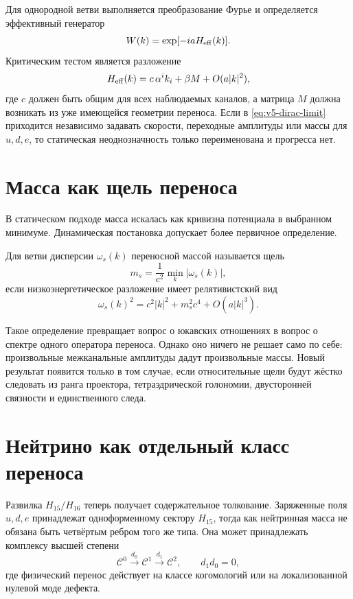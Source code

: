 Для однородной ветви выполняется преобразование Фурье и определяется
эффективный генератор
\begin{equation}
 W(k)=\exp[-iaH_{\rm eff}(k)].
\end{equation}
Критическим тестом является разложение
\begin{equation}
 H_{\rm eff}(k)=c\,\alpha^ik_i+\beta M+O(a|k|^2),
 \label{eq:v5-dirac-limit}
\end{equation}
где $c$ должен быть общим для всех наблюдаемых каналов, а матрица $M$
должна возникать из уже имеющейся геометрии переноса. Если в
\eqref{eq:v5-dirac-limit} приходится независимо задавать скорости,
переходные амплитуды или массы для $u,d,e$, то статическая неоднозначность
только переименована и прогресса нет.

\section{Масса как щель переноса}

В статическом подходе масса искалась как кривизна потенциала в выбранном
минимуме. Динамическая постановка допускает более первичное определение.

\begin{definition}
Для ветви дисперсии $\omega_s(k)$ переносной массой называется щель
\begin{equation}
 m_s=\frac1{c^2}\min_k|\omega_s(k)|,
 \end{equation}
если низкоэнергетическое разложение имеет релятивистский вид
\begin{equation}
 \omega_s(k)^2=c^2|k|^2+m_s^2c^4+O(a|k|^3).
 \label{eq:v5-relativistic-dispersion}
\end{equation}
\end{definition}

Такое определение превращает вопрос о юкавских отношениях в вопрос о
спектре одного оператора переноса. Однако оно ничего не решает само по
себе: произвольные межканальные амплитуды дадут произвольные массы. Новый
результат появится только в том случае, если относительные щели будут
жёстко следовать из ранга проектора, тетраэдрической голономии,
двусторонней связности и единственного следа.

\section{Нейтрино как отдельный класс переноса}

Развилка $H_{15}/H_{16}$ теперь получает содержательное толкование.
Заряженные поля $u,d,e$ принадлежат одноформенному сектору $H_{15}$, тогда
как нейтринная масса не обязана быть четвёртым ребром того же типа. Она
может принадлежать комплексу высшей степени
\begin{equation}
 \mathcal C^0\xrightarrow{d_0}\mathcal C^1
 \xrightarrow{d_1}\mathcal C^2,
 \qquad d_1d_0=0,
 \label{eq:v5-neutrino-complex}
\end{equation}
где физический перенос действует на классе когомологий или на
локализованной нулевой моде дефекта.

